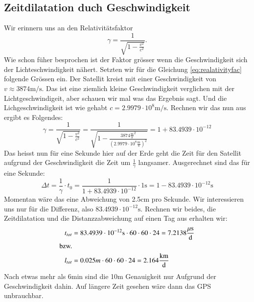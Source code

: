 \begin{refsection}
\subsection{Zeitdilatation duch Geschwindigkeit}
Wir erinnern uns an den Relativitätsfaktor
\begin{equation}
\label{eq:realativityfac}
\gamma = \frac{1}{\sqrt{\displaystyle 1 - \frac{v^2}{c^2}}}.
\end{equation}
Wie schon füher besprochen ist der Faktor grösser wenn die Geschwindigkeit sich der Lichteschwindigkeit nähert. Setzten wir für die Gleichung \eqref{eq:realativityfac} folgende Grössen ein. Der Satellit kreist mit einer Geschwindigkeit von \(v \approx 3874 \text{m/s} \). Das ist eine ziemlich kleine Geschwindigkeit verglichen mit der Lichtgeschwindigeit, aber schauen wir mal was das Ergebnis sagt. Und die Lichgeschwindigkeit ist wie gehabt \(c = 2.9979 \cdot 10^8 \text{m/s}\). 
Rechnen wir das nun aus ergibt es Folgendes:
\begin{equation}
\gamma = \frac{1}{\sqrt{\displaystyle 1 - \frac{v^2}{c^2}}} = \frac{1}{\sqrt{\displaystyle 1 - \frac{3874 \frac{\text{m}}{\text{s}}^2}{(2.9979 \cdot 10^8 \frac{\text{m}}{\text{s}} )^2}}} = 1 + 83.4939 \cdot 10^{-12}
\end{equation}
Das heisst nun für eine Sekunde hier auf der Erde geht die Zeit für den Satellit aufgrund der Geschwindigkeit die Zeit um \( \frac{1}{\gamma}\) langsamer. Ausgerechnet sind das für eine Sekunde:
\begin{equation}
\Delta t = \frac{1}{\gamma} \cdot t_0 = \frac{1}{1 + 83.4939 \cdot 10^{-12}} \cdot 1\text{s} = 1 - 83.4939 \cdot 10^{-12}\text{s}
\end{equation}
Momentan wäre das eine Abweichung von 2.5cm pro Sekunde. Wir interessieren uns nur für die Differenz, also \( 83.4939 \cdot 10^{-12}\text{s} \). Rechnen wir beides, die Zeitdilatation und die Distanzzabweichung auf einen Tag aus erhalten wir:
\begin{align*}
t_{tot} &= 83.4939 \cdot 10^{-12}\text{s} \cdot 60 \cdot 60 \cdot 24 = 7.2138  \frac{\mu \text{s}}{\text{d}}
\\
\textnormal{bzw.}
\\
 l_{tot} &= 0.025m \cdot 60 \cdot 60 \cdot 24 = 2.164 \frac{\text{km}}{\text{d}}
\end{align*}
Nach etwas mehr als 6min sind die 10m Genauigkeit nur Aufgrund der Geschwindigkeit dahin. Auf längere Zeit gesehen wäre dann das GPS unbrauchbar.


\end{refsection}
